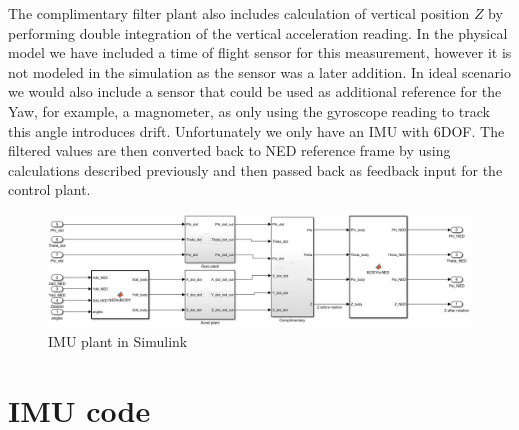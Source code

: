 \begin{flushleft}
The complimentary filter plant also includes calculation of vertical position $Z$ by performing double integration of the vertical acceleration reading. In the physical model we have included a time of flight sensor for this measurement, however it is not modeled in the simulation as the sensor was a later addition. In ideal scenario we would also include a sensor that could be used as additional reference for the Yaw, for example, a magnometer, as only using the gyroscope reading to track this angle introduces drift. Unfortunately we only have an IMU with 6DOF. 
The filtered values are then converted back to NED reference frame by using calculations described previously and then passed back as feedback input for the control plant.

\begin{figure}[H]
    \begin{center}
    \includegraphics[scale = 0.55]{pictures/IMU/IMU_plant.png}
    \end{center}
    \caption{IMU plant in Simulink}
    \label{fig:my_label}
\end{figure}

\end{flushleft}

\section{IMU code}


